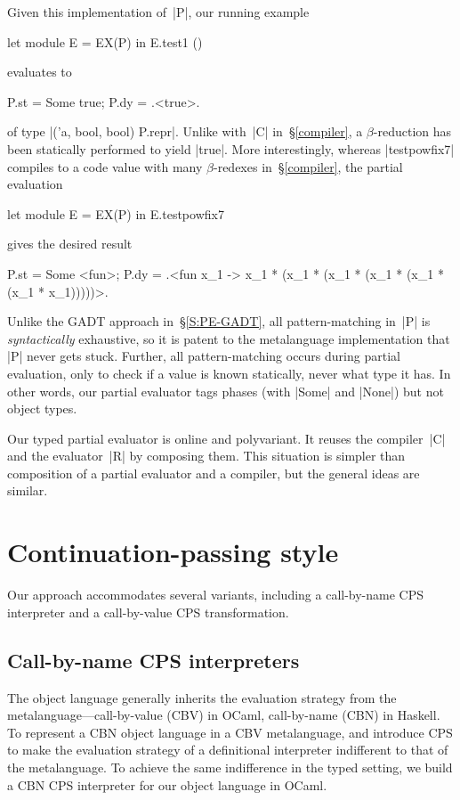 \documentclass[preprint]{sigplanconf}
\begin{document}
Given this implementation of~|P|, our running example
\begin{code}
let module E = EX(P) in E.test1 ()
\end{code}
evaluates to
\begin{code}
{P.st = Some true; P.dy = .<true>.}
\end{code}
of type |('a, bool, bool) P.repr|.  Unlike with~|C| in~\S\ref{compiler},
a $\beta$-reduction has been statically performed to yield |true|.  More
interestingly, whereas |testpowfix7| compiles to a code value with many
$\beta$-redexes in~\S\ref{compiler}, the partial evaluation
\begin{code}
let module E = EX(P) in E.testpowfix7
\end{code}
gives the desired result
\begin{code}
{P.st = Some <fun>;
 P.dy = .<fun x_1 -> x_1 * (x_1 * (x_1 * (x_1 *
                    (x_1 * (x_1 * x_1)))))>.}
\end{code}

Unlike the GADT approach in~\S\ref{S:PE-GADT}, all pattern\hyp matching
in~|P| is \emph{syntactically} exhaustive, so it is patent to the metalanguage
implementation that |P| never gets stuck.  Further, all pattern\hyp matching occurs
during partial evaluation, only to check if a value is known statically,
never what type it has.  In other words, our partial evaluator tags
phases (with |Some| and |None|) but not object types.

Our typed partial evaluator is online and polyvariant.  It reuses the
compiler~|C| and the evaluator~|R| by composing them.  This situation is
simpler than  composition of a partial
evaluator and a compiler, but the general ideas are similar.

\section{Continuation\hyp passing style}\label{variations}

Our approach accommodates
several variants, including
a call-by-name CPS interpreter and a call-by-value CPS
transformation.

\subsection{Call-by-name CPS interpreters}\label{S:CPS}

The object language generally inherits the evaluation strategy from
the metalanguage---call-by-value (CBV) in OCaml, call-by-name (CBN) in
Haskell.  To represent a CBN object language in a CBV metalanguage,
\citet{reynolds-definitional,reynolds-relation} and \citet{PlotkinCBN}
introduce CPS to make the evaluation strategy of a definitional
interpreter indifferent to that of the metalanguage. To achieve the same
indifference in the typed setting, we build a CBN CPS interpreter for
our object language in OCaml.
\end{document}
